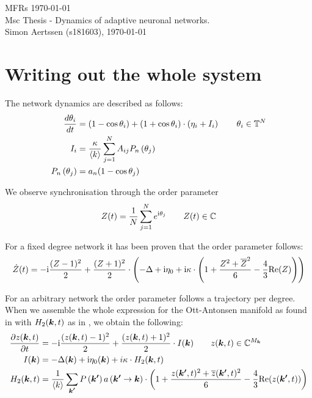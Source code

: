 


\mainmatter

MFRs \today \\
Msc Thesis - Dynamics of adaptive neuronal networks. \\
Simon Aertssen (s181603), \today \\ 

\section{Writing out the whole system}
The network dynamics are described as follows:
\begin{align}
\frac{d \theta_i}{d t} &= (1 - \cos\theta_i) + (1 + \cos\theta_i)\cdot\left(\eta_i + I_i \right) \qquad \theta_i \in {\mathbb{T}}^N \nonumber \\
I_{i} &= \frac{\kappa}{\langle k\rangle} \sum_{j=1}^{N} A_{i j} P_{n}\left(\theta_{j}\right) \label{eq:FullThetaNeuronNetwork} \\
P_{n}\left(\theta_{j}\right) &= a_n (1 - \cos\theta_j) \nonumber
\end{align}

We observe synchronisation through the order parameter
\begin{align}
Z(t) = \frac{1}{N} \sum_{j=1}^N e^{{\rm{i}}\theta_j}  \qquad Z(t) \in {\mathbb{C}} \label{eq:orderparameter}
\end{align}

For a fixed degree network it has been proven that the order parameter follows:
\begin{align}
\dot{Z}(t)= -{\rm{i}} \frac{(Z-1)^2}{2}+\frac{(Z+1)^2}{2} \cdot \left(-\Delta+ {\rm{i}}\eta_{0}
+ {\rm{i}} \kappa \cdot \left(1+\frac{Z^{2} + \overline{Z}^{2} }{6} - \frac{4}{3} {\operatorname{Re}}(Z)\right)\right) \label{eq:MeanField}
\end{align}
    
For an arbitrary network the order parameter follows a trajectory per degree. When we assemble the whole expression for the Ott-Antonsen manifold as found in \cite{OttAntonsen2017} with $H_2({\boldsymbol{k}},t)$ as in \cite{Martens2020}, we obtain the following:
\begin{align}
\frac{\partial z({\boldsymbol{k}}, t)}{\partial t} &= -{\rm{i}} \frac{(z({\boldsymbol{k}}, t)-1)^{2}}{2} + \frac{(z({\boldsymbol{k}}, t)+1)^{2}}{2} \cdot I({\boldsymbol{k}}) \qquad z({\boldsymbol{k}},t) \in {\mathbb{C}}^{M_{\boldsymbol{k}}} \nonumber \\
I({\boldsymbol{k}}) &= -\Delta({\boldsymbol{k}}) + {\rm{i}} \eta_{0}({\boldsymbol{k}}) + i \kappa \cdot H_2({\boldsymbol{k}},t) \label{eq:OttAntonsenSystemFull} \\
H_2({\boldsymbol{k}},t) &= \frac{1}{{\langle k\rangle}} \sum_{{\boldsymbol{k'}}} P\left({\boldsymbol{k'}}\right) a\left({\boldsymbol{k'}} \rightarrow {\boldsymbol{k}}\right) \cdot \left( 1 + \frac{z({\boldsymbol{k'}}, t)^2 + \overline{z}({\boldsymbol{k'}}, t)^2}{6} - \frac{4}{3} {\operatorname{Re}}(z({\boldsymbol{k'}}, t)) \right) \nonumber
\end{align}

